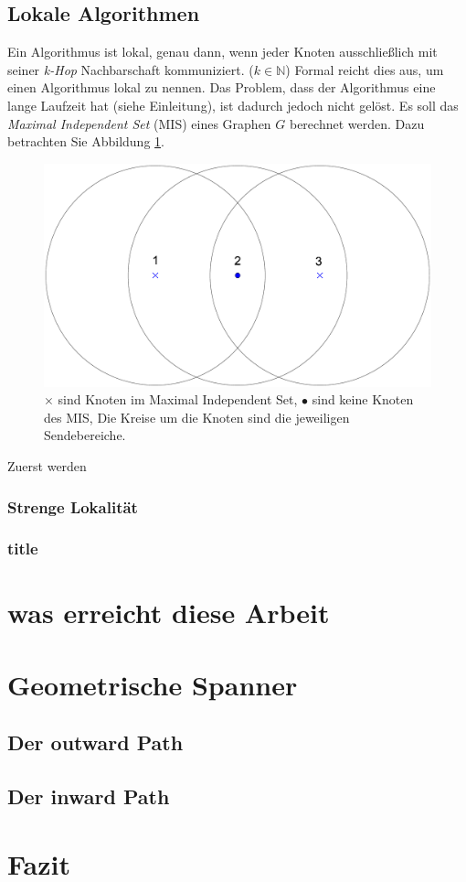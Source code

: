 \documentclass[a4paper,twoside]{IEEEtran}
\begin{document}
\subsection{Lokale Algorithmen}
Ein Algorithmus ist lokal, genau dann, wenn jeder Knoten ausschließlich mit seiner \textit{k-Hop} Nachbarschaft kommuniziert. ($k \in \mathds{N}$)
Formal reicht dies aus, um einen Algorithmus lokal zu nennen.
Das Problem, dass der Algorithmus eine lange Laufzeit hat (siehe Einleitung), ist dadurch jedoch nicht gelöst.
Es soll das \textit{Maximal Independent Set} (MIS) eines Graphen $G $ berechnet werden.
Dazu betrachten Sie Abbildung \ref{fig:MIS}.

\begin{figure}[h!]
\centering
\includegraphics[width=0.99\linewidth]{MIS.eps}
\caption{$\times $ sind Knoten im Maximal Independent Set, $\bullet $ sind keine Knoten des MIS, Die Kreise um die Knoten sind die jeweiligen Sendebereiche.}
\label{fig:MIS}
\end{figure}


Zuerst werden




\subsubsection{Strenge Lokalität}

\subsubsection{title}


\section{was erreicht diese Arbeit} %

\section{Geometrische Spanner}
\subsection{Der outward Path}
\subsection{Der inward Path}


\section{Fazit}





\end{document}
